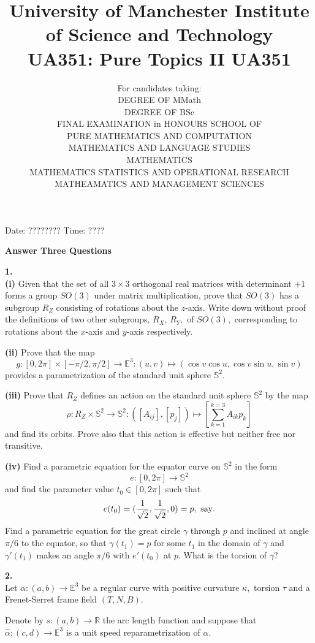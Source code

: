 \documentclass[12pt]{article}
\date{ }
\title{{University of Manchester Institute of Science and Technology}\\ \vspace*{2cm}
{\small UA351: Pure Topics II \hfill UA351}}
\author{\hspace*{-14cm}For candidates taking:\hfill \\DEGREE OF MMath\\
DEGREE OF BSc\\
FINAL EXAMINATION in HONOURS SCHOOL OF \\
PURE MATHEMATICS AND COMPUTATION\\ MATHEMATICS AND LANGUAGE STUDIES\\
MATHEMATICS\\ MATHEMATICS STATISTICS AND OPERATIONAL RESEARCH\\
MATHEAMATICS AND MANAGEMENT SCIENCES}
\def\E{\mathbb{E}}
\def\bS{\mathbb{S}}
\def\R{\mathbb{R}}
\begin{document}
\maketitle
\vspace*{3cm}
Date: ???????? \hfill Time: ????

\vspace*{3cm}
\begin{center}
{\large\bf Answer Three Questions}
\end{center}

\newpage
{\large\bf 1.}\\
{\large\bf (i)} Given that the set of all $3\times 3$ orthogonal
real matrices with determinant $+1$
forms a group $SO(3)$ under matrix multiplication, prove that $SO(3)$ has a
subgroup $R_Z$ consisting of rotations about the $z$-axis. Write down without proof
the definitions of two other subgroups, $R_X, \, R_Y,$ of $SO(3),$ corresponding
to rotations about the $x$-axis and $y$-axis respectively.

{\large\bf (ii)} Prove that the map
$$g:[0,2\pi]\times [-\pi/2,\pi/2]\rightarrow \E^3 :
(u,v) \mapsto (\cos v \cos u, \cos v\sin u, \sin v)$$ provides a parametrization
of the standard unit sphere $\bS^2.$

{\large\bf (iii)} Prove that $R_Z$ defines an action on the
standard unit sphere $\bS^2$ by the map $$\rho:R_Z\times \bS^2
\rightarrow \bS^2 : ([A_{ij}],[p_j]) \mapsto
[\sum_{k=1}^{k=3}A_{ik}p_k]$$ and find its orbits. Prove also that
this action is effective but neither free nor transitive.

{\large\bf (iv)} Find a parametric equation for the equator curve on $\bS^2$ in the form
$$e:[0,2\pi]\rightarrow \bS^2$$
and find the parameter value $t_0\in [0,2\pi]$ such that
$$e(t_0)=(\frac{1}{\sqrt 2},\frac{1}{\sqrt 2},0) = p, \  {\rm say}.$$
Find a parametric equation for the great circle $\gamma$ through $p$ and inclined at
angle $\pi/6$ to the equator, so that $\gamma(t_1)=p$ for some $t_1$ in the domain
of $\gamma$ and $\gamma'(t_1)$ makes an angle $\pi/6$ with $e'(t_0)$ at $p.$
What is the torsion of $\gamma?$

\newpage
{\large\bf 2.}\\
Let $\alpha :(a,b)\rightarrow \E^3$ be a regular curve with positive curvature $\kappa,$
torsion $\tau$ and a Frenet-Serret frame field $(T,N,B).$

Denote by $s:(a,b)\rightarrow \R$ the arc length function and suppose that
$\hat{\alpha} :(c,d)\rightarrow \E^3$ is a unit speed reparametrization of $\alpha.$
\end{document}
